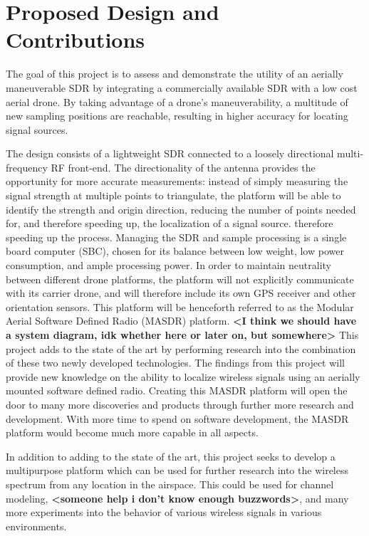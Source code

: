 \section{Proposed Design and Contributions}
The goal of this project is to assess and demonstrate the utility of an aerially maneuverable SDR by integrating a commercially available SDR with a low cost aerial drone. By taking advantage of a drone's maneuverability, a multitude of new sampling positions are reachable, resulting in higher accuracy for locating signal sources.\par
The design consists of a lightweight SDR connected to a loosely directional multi-frequency RF front-end. The directionality of the antenna provides the opportunity for more accurate measurements: instead of simply measuring the signal strength at multiple points to triangulate, the platform will be able to identify the strength and origin direction, reducing the number of points needed for, and therefore speeding up, the localization of a signal source. therefore speeding up the process. Managing the SDR and sample processing is a single board computer (SBC), chosen for its balance between low weight, low power consumption, and ample processing power. In order to maintain neutrality between different drone platforms, the platform will not explicitly communicate with its carrier drone, and will therefore include its own GPS receiver and other orientation sensors. This platform will be henceforth referred to as the Modular Aerial Software Defined Radio (MASDR) platform. \textbf{<I think we should have a system diagram, idk whether here or later on, but somewhere>} This project adds to the state of the art by performing research into the combination of these two newly developed technologies. The findings from this project will provide new knowledge on the ability to localize wireless signals using an aerially mounted software defined radio. Creating this MASDR platform will open the door to many more discoveries and products through further more research and development. With more time to spend on software development, the MASDR platform would become much more capable in all aspects.\par
In addition to adding to the state of the art, this project seeks to develop a multipurpose platform which can be used for further research into the wireless spectrum from any location in the airspace. This could be used for channel modeling, \textbf{<someone help i don’t know enough buzzwords>}, and many more experiments into the behavior of various wireless signals in various environments.\par
